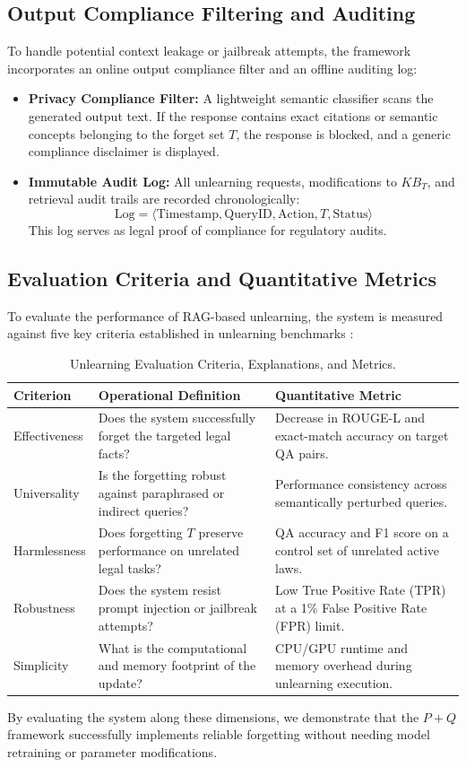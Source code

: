 \subsection{Output Compliance Filtering and Auditing}
To handle potential context leakage or jailbreak attempts, the framework incorporates an online output compliance filter and an offline auditing log:
\begin{itemize}
    \item \textbf{Privacy Compliance Filter:} A lightweight semantic classifier scans the generated output text. If the response contains exact citations or semantic concepts belonging to the forget set $T$, the response is blocked, and a generic compliance disclaimer is displayed.
    \item \textbf{Immutable Audit Log:} All unlearning requests, modifications to $KB_T$, and retrieval audit trails are recorded chronologically:
    \begin{equation}
        \text{Log} = \langle \text{Timestamp}, \text{QueryID}, \text{Action}, T, \text{Status} \rangle
    \end{equation}
    This log serves as legal proof of compliance for regulatory audits.
\end{itemize}

\subsection{Evaluation Criteria and Quantitative Metrics}
To evaluate the performance of RAG-based unlearning, the system is measured against five key criteria established in unlearning benchmarks \parencite{11207222}:
\begin{table}[H]
\centering
\caption{Unlearning Evaluation Criteria, Explanations, and Metrics.}
\label{tab:unlearning_metrics}
\begin{tabularx}{\textwidth}{lXX}
\hline
\textbf{Criterion} & \textbf{Operational Definition} & \textbf{Quantitative Metric} \\
\hline
Effectiveness & Does the system successfully forget the targeted legal facts? & Decrease in ROUGE-L and exact-match accuracy on target QA pairs. \\
Universality & Is the forgetting robust against paraphrased or indirect queries? & Performance consistency across semantically perturbed queries. \\
Harmlessness & Does forgetting $T$ preserve performance on unrelated legal tasks? & QA accuracy and F1 score on a control set of unrelated active laws. \\
Robustness & Does the system resist prompt injection or jailbreak attempts? & Low True Positive Rate (TPR) at a 1\% False Positive Rate (FPR) limit. \\
Simplicity & What is the computational and memory footprint of the update? & CPU/GPU runtime and memory overhead during unlearning execution. \\
\hline
\end{tabularx}
\end{table}

By evaluating the system along these dimensions, we demonstrate that the $P+Q$ framework successfully implements reliable forgetting without needing model retraining or parameter modifications.

